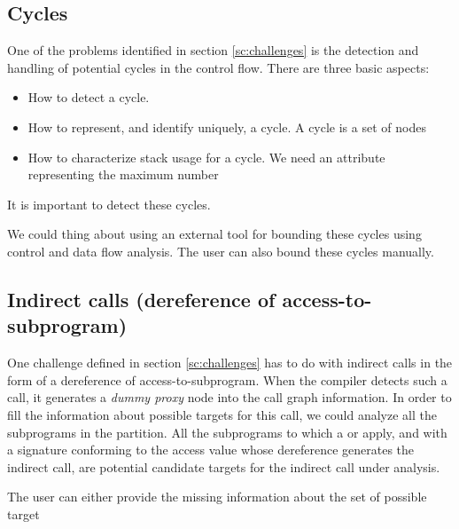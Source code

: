 \subsection{Cycles}

One of the problems identified in section \ref{sc:challenges} is the
detection and handling of potential cycles in the control flow. There
are three basic aspects:

\begin{itemize}

\item How to detect a cycle.

\item How to represent, and identify uniquely, a cycle. A cycle is a set of nodes

\item How to characterize stack usage for a cycle. We need an
  attribute representing the maximum number 

\end{itemize}

It is important to detect these cycles.

We could thing about using an external tool for bounding these cycles
using control and data flow analysis. The user can also bound these
cycles manually.

\subsection{Indirect calls (dereference of access-to-subprogram)}

One challenge defined in section \ref{sc:challenges} has to do
with indirect calls in the form of a dereference of
access-to-subprogram. When the compiler detects such a call, it
generates a \emph{dummy proxy} node into the call graph
information. In order to fill the information about possible targets
for this call, we could analyze all the subprograms in the
partition. All the subprograms to which a  or
 apply, and with a signature conforming to
the access value whose dereference generates the indirect call, are
potential candidate targets for the indirect call under analysis.

The user can either provide the missing information about the set of
possible target 

